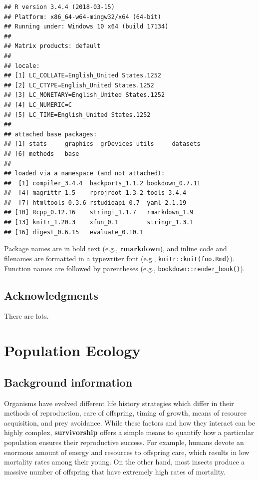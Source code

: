 \documentclass[]{krantz}
\theoremstyle{definition}
\theoremstyle{definition}
\theoremstyle{definition}
\theoremstyle{remark}
\begin{document}
\begin{verbatim}
## R version 3.4.4 (2018-03-15)
## Platform: x86_64-w64-mingw32/x64 (64-bit)
## Running under: Windows 10 x64 (build 17134)
## 
## Matrix products: default
## 
## locale:
## [1] LC_COLLATE=English_United States.1252 
## [2] LC_CTYPE=English_United States.1252   
## [3] LC_MONETARY=English_United States.1252
## [4] LC_NUMERIC=C                          
## [5] LC_TIME=English_United States.1252    
## 
## attached base packages:
## [1] stats     graphics  grDevices utils     datasets 
## [6] methods   base     
## 
## loaded via a namespace (and not attached):
##  [1] compiler_3.4.4  backports_1.1.2 bookdown_0.7.11
##  [4] magrittr_1.5    rprojroot_1.3-2 tools_3.4.4    
##  [7] htmltools_0.3.6 rstudioapi_0.7  yaml_2.1.19    
## [10] Rcpp_0.12.16    stringi_1.1.7   rmarkdown_1.9  
## [13] knitr_1.20.3    xfun_0.1        stringr_1.3.1  
## [16] digest_0.6.15   evaluate_0.10.1
\end{verbatim}

Package names are in bold text (e.g., \textbf{rmarkdown}), and inline
code and filenames are formatted in a typewriter font (e.g.,
\texttt{knitr::knit(\textquotesingle{}foo.Rmd\textquotesingle{})}).
Function names are followed by parentheses (e.g.,
\texttt{bookdown::render\_book()}).

\section*{Acknowledgments}\label{acknowledgments}


There are lots.

\mainmatter

\chapter{Population Ecology}\label{population}

\section{Background information}\label{background-information}

Organisms have evolved different life history strategies which differ in
their methods of reproduction, care of offspring, timing of growth,
means of resource acquisition, and prey avoidance. While these factors
and how they interact can be highly complex, \textbf{survivorship}
offers a simple means to quantify how a particular population ensures
their reproductive success. For example, humans devote an enormous
amount of energy and resources to offspring care, which results in low
mortality rates among their young. On the other hand, most insects
produce a massive number of offspring that have extremely high rates of
mortality.
\end{document}
